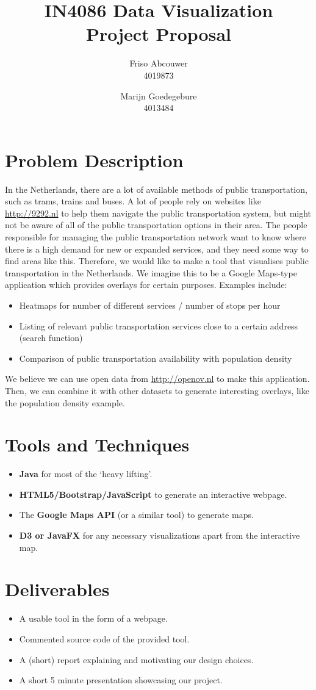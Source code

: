 \documentclass[a4paper,11pt]{article}
\title{IN4086 Data Visualization \\
Project Proposal \\ }
\author{
Friso Abcouwer \\
4019873 \\
\and
Marijn Goedegebure \\
4013484
}
\begin{document}
\maketitle{}
\newpage

\section{Problem Description}
In the Netherlands, there are a lot of available methods of public transportation, such as trams, trains and buses.
A lot of people rely on websites like \url{http://9292.nl} to help them navigate the public transportation system, but might not be aware of all of the public transportation options in their area. The people responsible for managing the public transportation network want to know where there is a high demand for new or expanded services, and they need some way to find areas like this.
Therefore, we would like to make a tool that visualises public transportation in the Netherlands. We imagine this to be a Google Maps-type application which provides overlays for certain purposes. Examples include:
\begin{itemize}
\item Heatmaps for number of different services / number of stops per hour
\item Listing of relevant public transportation services close to a certain address (search function)
\item Comparison of public transportation availability with population density
\end{itemize}
We believe we can use open data from \url{http://openov.nl} to make this application. Then, we can combine it with other datasets to generate interesting overlays, like the population density example.

\section{Tools and Techniques}
\begin{itemize}
\item \textbf{Java} for most of the `heavy lifting'.
\item \textbf{HTML5/Bootstrap/JavaScript} to generate an interactive webpage.
\item The \textbf{Google Maps API} (or a similar tool) to generate maps.
\item \textbf{D3 or JavaFX} for any necessary visualizations apart from the interactive map.
\end{itemize}

\section{Deliverables}
\begin{itemize}
\item A usable tool in the form of a webpage.
\item Commented source code of the provided tool.
\item A (short) report explaining and motivating our design choices.
\item A short 5 minute presentation showcasing our project.
\end{itemize}
\end{document}
